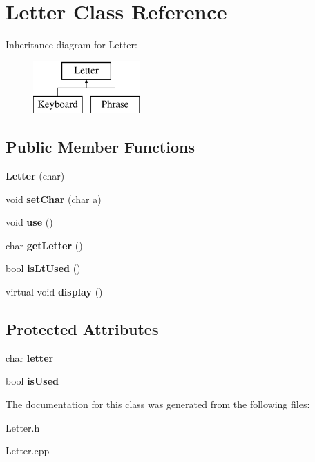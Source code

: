 \hypertarget{class_letter}{}\section{Letter Class Reference}
\label{class_letter}
Inheritance diagram for Letter\+:\begin{figure}[H]
\begin{center}
\leavevmode
\includegraphics[height=2.000000cm]{class_letter}
\end{center}
\end{figure}
\subsection*{Public Member Functions}
\begin{DoxyCompactItemize}
\item 
\hypertarget{class_letter_a3bee19251225ca9f2f958191a5a7daba}{}\label{class_letter_a3bee19251225ca9f2f958191a5a7daba} 
{\bfseries Letter} (char)
\item 
\hypertarget{class_letter_ab4c06bc667637903013f93cc30fcde58}{}\label{class_letter_ab4c06bc667637903013f93cc30fcde58} 
void {\bfseries set\+Char} (char a)
\item 
\hypertarget{class_letter_a3de38802f3c236230882da7b83f930c4}{}\label{class_letter_a3de38802f3c236230882da7b83f930c4} 
void {\bfseries use} ()
\item 
\hypertarget{class_letter_a3b48f5b3d03e4a48d34d5a40c2af5190}{}\label{class_letter_a3b48f5b3d03e4a48d34d5a40c2af5190} 
char {\bfseries get\+Letter} ()
\item 
\hypertarget{class_letter_ae6ee6c11da6b6980f3860325ab5a9af1}{}\label{class_letter_ae6ee6c11da6b6980f3860325ab5a9af1} 
bool {\bfseries is\+Lt\+Used} ()
\item 
\hypertarget{class_letter_a5c54b5095ed21b6c68a7c8ef2d33b1a0}{}\label{class_letter_a5c54b5095ed21b6c68a7c8ef2d33b1a0} 
virtual void {\bfseries display} ()
\end{DoxyCompactItemize}
\subsection*{Protected Attributes}
\begin{DoxyCompactItemize}
\item 
\hypertarget{class_letter_add29e231aa209f890a891ea202dbff4a}{}\label{class_letter_add29e231aa209f890a891ea202dbff4a} 
char {\bfseries letter}
\item 
\hypertarget{class_letter_ad1996ff2106ebfad001df34fd2484a0a}{}\label{class_letter_ad1996ff2106ebfad001df34fd2484a0a} 
bool {\bfseries is\+Used}
\end{DoxyCompactItemize}


The documentation for this class was generated from the following files\+:\begin{DoxyCompactItemize}
\item 
Letter.\+h\item 
Letter.\+cpp\end{DoxyCompactItemize}
